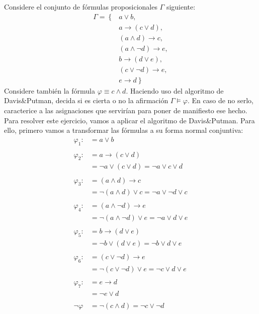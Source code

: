 \documentclass[12pt]{article}
\begin{document}
\begin{ejercicio} \label{ej:3}
    Considere el conjunto de fórmulas proposicionales $\Gamma$ siguiente:
    \begin{align*}
        \Gamma = \left\{ \right.&
            a\lor b, \\ &
            a\rightarrow (c\lor d), \\ &
            (a\land d) \rightarrow c, \\ &
            (a\land \lnot d) \rightarrow e, \\ &
            b\rightarrow (d\lor e), \\ &
            (c\lor \lnot d) \rightarrow e, \\ &
            e\rightarrow d \left.\right\}
    \end{align*}
    Considere también la fórmula $\varphi \equiv c\land d$. Haciendo uso del
    algoritmo de Davis\&Putman, decida si es cierta o no la afirmación $\Gamma \models \varphi$. En caso de
    no serlo, caracterice a las asignaciones que servirían para poner de manifiesto ese hecho.\\

    Para resolver este ejercicio, vamos a aplicar el algoritmo de Davis\&Putman. Para ello, primero
    vamos a transformar las fórmulas a su forma normal conjuntiva:
    \begin{align*}
        \varphi_1 :& = a\lor b\\ \\
        \varphi_2 :& = a\rightarrow (c\lor d)\\
        & = \lnot a \lor (c\lor d) = \lnot a \lor c \lor d\\ \\
        \varphi_3 :& = (a\land d) \rightarrow c\\
        & = \lnot (a\land d) \lor c = \lnot a \lor \lnot d \lor c\\ \\
        \varphi_4 :& = (a\land \lnot d) \rightarrow e\\
        & = \lnot (a\land \lnot d) \lor e = \lnot a \lor d \lor e\\ \\
        \varphi_5 :& = b\rightarrow (d\lor e)\\
        & = \lnot b \lor (d\lor e) = \lnot b \lor d \lor e\\ \\
        \varphi_6 :& = (c\lor \lnot d) \rightarrow e\\
        & = \lnot (c\lor \lnot d) \lor e = \lnot c \lor d \lor e\\ \\
        \varphi_7 :& = e\rightarrow d\\
        & = \lnot e \lor d \\ \\
        \lnot \varphi & = \lnot (c\land d) = \lnot c \lor \lnot d
    \end{align*}


\end{ejercicio}
\end{document}
